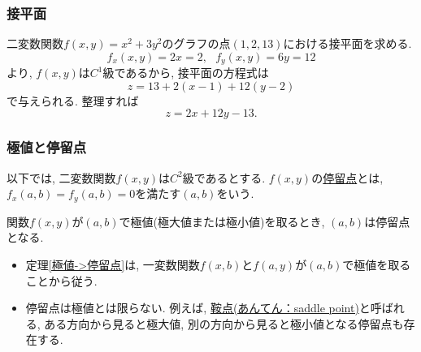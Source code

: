 

%
%
%




\begin{frame}
\frametitle{接平面}

二変数関数$f(x,y)=x^2+3y^2$のグラフの点$(1,2,13)$における接平面を求める. 
$$
f_x(x,y)=2x=2, \ \ \ f_y(x,y)=6y=12
$$
より, $f(x,y)$は$C^1$級であるから, 接平面の方程式は
$$
z=13+2(x-1)+12(y-2)
$$
で与えられる. 整理すれば
$$
z=2x+12y-13. 
$$

\end{frame}




\begin{frame}
\frametitle{極値と停留点}

以下では, 二変数関数$f(x,y)$は$C^2$級であるとする. 
$f(x,y)$の\underline{停留点}とは, $f_x(a,b) = f_y(a,b) = 0$を満たす$(a,b)$をいう. 

\begin{Thm} \label{極値->停留点}
関数$f(x,y)$が$(a,b)$で極値(極大値または極小値)を取るとき, $(a,b)$は停留点となる. 
\end{Thm}

\begin{itemize}
\item 定理\ref{極値->停留点}は, 一変数関数$f(x,b)$と$f(a,y)$が$(a,b)$で極値を取ることから従う. 
\item 停留点は極値とは限らない. 例えば, \underline{鞍点(あんてん：saddle point)}と呼ばれる, ある方向から見ると極大値, 別の方向から見ると極小値となる停留点も存在する. 
\end{itemize}

\end{frame}





